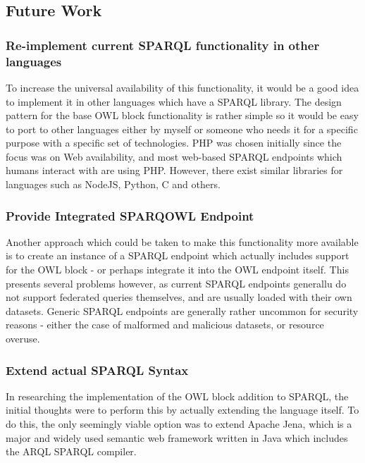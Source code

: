 \documentclass{article}
\begin{document}
\subsection{Future Work}

\subsubsection{Re-implement current SPARQL functionality in other languages}

To increase the universal availability of this functionality, it would be a good
idea to implement it in other languages which
have a SPARQL library. The design pattern for the base OWL block functionality
is rather simple so it would be easy to port
to other languages either by myself or someone who needs it for a specific
purpose with a specific set of technologies. PHP
was chosen initially since the focus was on Web availability, and most web-based
SPARQL endpoints which humans interact with
are using PHP. However, there exist similar libraries for languages such as
NodeJS, Python, C and others.

\subsubsection{Provide Integrated SPARQOWL Endpoint}

Another approach which could be taken to make this functionality more available
is to create an instance of a SPARQL endpoint which actually includes support
for the OWL block - or perhaps integrate it into the OWL endpoint itself. This
presents several problems however, as current SPARQL endpoints generallu do not
support federated queries themselves, and are usually loaded with their own
datasets. Generic SPARQL endpoints are generally rather uncommon for security
reasons - either the case of malformed and malicious datasets, or resource
overuse.

\subsubsection{Extend actual SPARQL Syntax}

In researching the implementation of the OWL block addition to SPARQL, the
initial thoughts were to perform this by actually extending the language itself.
To do this, the only seemingly viable option was to extend Apache Jena, which is
a major and widely used semantic web framework written in Java which includes the 
ARQL SPARQL compiler. 
\end{document}
